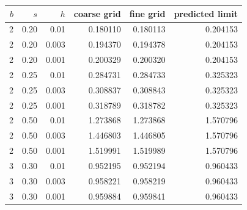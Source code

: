 \begin{tabular}{@{}rrrrrr@{}}
\toprule
$b$ & $s$ & $h$ & coarse grid & fine grid & predicted limit\\
\midrule
2 & 0.20 & 0.01 & 0.180110 & 0.180113 & 0.204153\\
2 & 0.20 & 0.003 & 0.194370 & 0.194378 & 0.204153\\
2 & 0.20 & 0.001 & 0.200329 & 0.200320 & 0.204153\\
2 & 0.25 & 0.01 & 0.284731 & 0.284733 & 0.325323\\
2 & 0.25 & 0.003 & 0.308837 & 0.308843 & 0.325323\\
2 & 0.25 & 0.001 & 0.318789 & 0.318782 & 0.325323\\
2 & 0.50 & 0.01 & 1.273868 & 1.273868 & 1.570796\\
2 & 0.50 & 0.003 & 1.446803 & 1.446805 & 1.570796\\
2 & 0.50 & 0.001 & 1.519991 & 1.519989 & 1.570796\\
3 & 0.30 & 0.01 & 0.952195 & 0.952194 & 0.960433\\
3 & 0.30 & 0.003 & 0.958221 & 0.958219 & 0.960433\\
3 & 0.30 & 0.001 & 0.959884 & 0.959841 & 0.960433\\
\bottomrule
\end{tabular}

